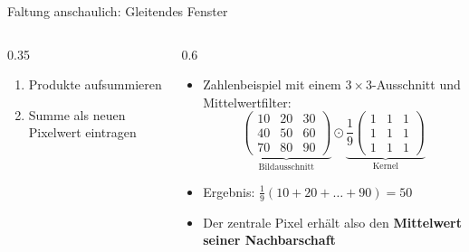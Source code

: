 {\begin{frame}{Faltung anschaulich: Gleitendes Fenster}
\begin{columns}
\begin{column}{0.35\textwidth}
\begin{itemize}
\begin{enumerate}
        \item Produkte aufsummieren
        \item Summe als neuen Pixelwert eintragen
    \end{enumerate}
\end{itemize}
\end{column}
\begin{column}{0.6\textwidth}
\begin{itemize}
    \item Zahlenbeispiel mit einem $3 \times 3$-Ausschnitt und Mittelwertfilter:
    \[
    \underbrace{\begin{pmatrix} 10 & 20 & 30 \\ 40 & 50 & 60 \\ 70 & 80 & 90 \end{pmatrix}}_{\text{Bildausschnitt}}
    \odot
    \underbrace{\frac{1}{9}\begin{pmatrix} 1 & 1 & 1 \\ 1 & 1 & 1 \\ 1 & 1 & 1 \end{pmatrix}}_{\text{Kernel}}
    \]
    \item Ergebnis: $\frac{1}{9}(10 + 20 + \dots + 90) = 50$
    \item Der zentrale Pixel erhält also den \textbf{Mittelwert seiner Nachbarschaft}
\end{itemize}
\end{column}
\end{columns}
\end{frame}

}
